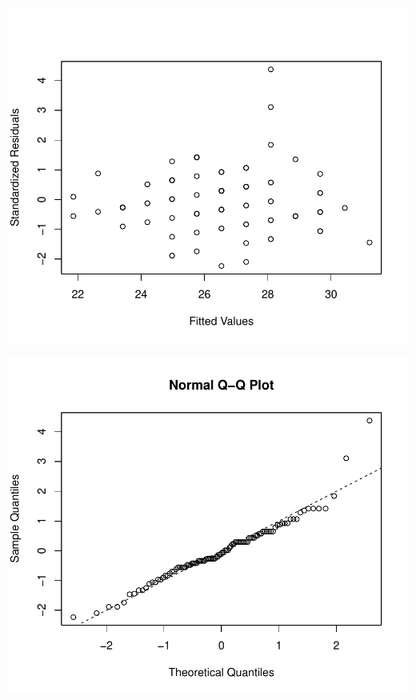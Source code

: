 \documentclass[final]{article}\usepackage[]{graphicx}\usepackage[svgnames]{xcolor}
\makeatletter
\def\maxwidth{ %
  \ifdim\Gin@nat@width>\linewidth
    \linewidth
  \else
    \Gin@nat@width
  \fi
}
\newenvironment{knitrout}{}{} %
\makeatother
\begin{document}
\begin{knitrout}
\color{fgcolor}

{\centering \includegraphics[width=\maxwidth]{figure/unnamed-chunk-10-1} 

}




{\centering \includegraphics[width=\maxwidth]{figure/unnamed-chunk-10-2} 

}


\end{knitrout}
\end{document}
